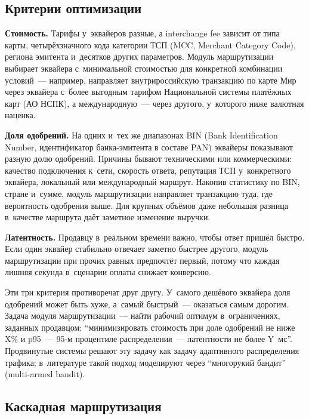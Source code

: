 \subsection*{Критерии оптимизации}

\textbf{Стоимость.} Тарифы у~эквайеров разные, а interchange fee
зависит от типа карты, четырёхзначного кода категории ТСП
(MCC, Merchant Category Code), региона эмитента и~десятков других
параметров. Модуль маршрутизации выбирает эквайера с~минимальной
стоимостью для конкретной комбинации условий~--- например,
направляет внутрироссийскую транзакцию по карте Мир через
эквайера с~более выгодным тарифом Национальной системы платёжных
карт (АО НСПК), а международную~--- через другого, у~которого ниже
валютная наценка.

\textbf{Доля одобрений.} На одних и~тех же диапазонах BIN (Bank
Identification Number, идентификатор банка-эмитента в составе PAN)
эквайеры показывают разную долю одобрений. Причины бывают техническими
или коммерческими: качество подключения к~сети, скорость ответа,
репутация ТСП у~конкретного эквайера, локальный или международный
маршрут. Накопив статистику по BIN, стране и~сумме, модуль
маршрутизации направляет транзакцию туда, где вероятность одобрения
выше. Для крупных объёмов даже небольшая разница в~качестве маршрута
даёт заметное изменение выручки.

\textbf{Латентность.} Продавцу в~реальном времени важно, чтобы
ответ пришёл быстро. Если один эквайер стабильно
отвечает заметно быстрее другого, модуль маршрутизации при
прочих равных предпочтёт первый, потому что каждая лишняя секунда
в~сценарии оплаты снижает конверсию.

Эти три критерия противоречат друг другу. У~самого дешёвого эквайера
доля одобрений может быть хуже, а~самый быстрый~--- оказаться
самым дорогим. Задача модуля маршрутизации~--- найти рабочий
оптимум в~ограничениях, заданных продавцом: \enquote{минимизировать
  стоимость при доле одобрений не ниже X\% и p95~--- 95-м процентиле
распределения~--- латентности не более Y~мс}. Продвинутые системы
решают эту задачу как задачу адаптивного распределения трафика;
в~литературе такой подход моделируют через
\enquote{многорукий бандит} (multi-armed bandit).

\subsection*{Каскадная маршрутизация}

